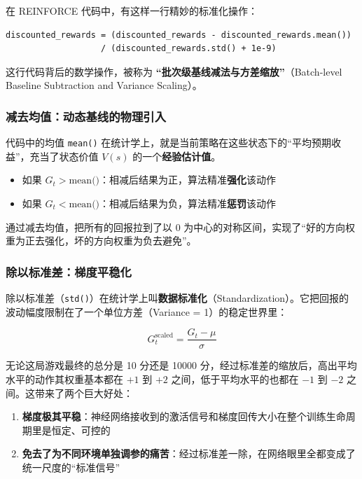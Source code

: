 \documentclass[12pt,a4paper]{article}
\theoremstyle{noteplain}
\theoremstyle{noteexercise}
\begin{document}
在 REINFORCE 代码中，有这样一行精妙的标准化操作：

\begin{lstlisting}
discounted_rewards = (discounted_rewards - discounted_rewards.mean())
                   / (discounted_rewards.std() + 1e-9)
\end{lstlisting}

这行代码背后的数学操作，被称为 \textbf{``批次级基线减法与方差缩放''}（Batch-level Baseline Subtraction and Variance Scaling）。

\subsubsection{减去均值：动态基线的物理引入}

代码中的均值 \lstinline|mean()| 在统计学上，就是当前策略在这些状态下的``平均预期收益''，充当了状态价值 $V(s)$ 的一个\textbf{经验估计值}。

\begin{itemize}
  \setlength{\itemsep}{0.2em}
  \item 如果 $G_t > \text{mean()}$：相减后结果为正，算法精准\textbf{强化}该动作
  \item 如果 $G_t < \text{mean()}$：相减后结果为负，算法精准\textbf{惩罚}该动作
\end{itemize}

通过减去均值，把所有的回报拉到了以 $0$ 为中心的对称区间，实现了``好的方向权重为正去强化，坏的方向权重为负去避免''。

\subsubsection{除以标准差：梯度平稳化}

除以标准差（\lstinline|std()|）在统计学上叫\textbf{数据标准化}（Standardization）。它把回报的波动幅度限制在了一个单位方差（Variance = 1）的稳定世界里：

\begin{equation}\label{eq:standardized}
  G_t^{\text{scaled}} = \frac{G_t - \mu}{\sigma}
\end{equation}

无论这局游戏最终的总分是 10 分还是 10000 分，经过标准差的缩放后，高出平均水平的动作其权重基本都在 $+1$ 到 $+2$ 之间，低于平均水平的也都在 $-1$ 到 $-2$ 之间。这带来了两个巨大好处：

\begin{enumerate}
  \setlength{\itemsep}{0.2em}
  \item \textbf{梯度极其平稳}：神经网络接收到的激活信号和梯度回传大小在整个训练生命周期里是恒定、可控的
  \item \textbf{免去了为不同环境单独调参的痛苦}：经过标准差一除，在网络眼里全都变成了统一尺度的``标准信号''
\end{enumerate}
\end{document}

